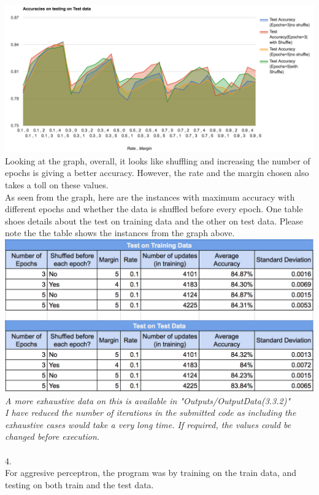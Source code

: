 \documentclass[12pt, fullpage,letterpaper]{article}
\begin{document}
\includegraphics[scale=0.45]{333Test.png}\\
Looking at the graph, overall, it looks like shuffling and increasing the number of epochs is giving a better accuracy. However, the rate and the margin chosen also takes a toll on these values.\\ As seen from the graph, here are the instances with maximum accuracy with different epochs and whether the data is shuffled before every epoch. One table shoes details about the test on training data and the other on test data. Please note the the table shows the instances from the graph above.\\
 \includegraphics[scale=0.7]{333data.png}\\
 \emph{A more exhaustive data on this is available in "Outputs/OutputData(3.3.2)"\\
I have reduced the number of iterations in the submitted code as including the exhaustive cases would take a very long time. If required, the values could be changed before execution.}\\\\
4.\\
For aggresive perceptron, the program was by training on the train data, and testing on both train and the test data.\\
\end{document}
